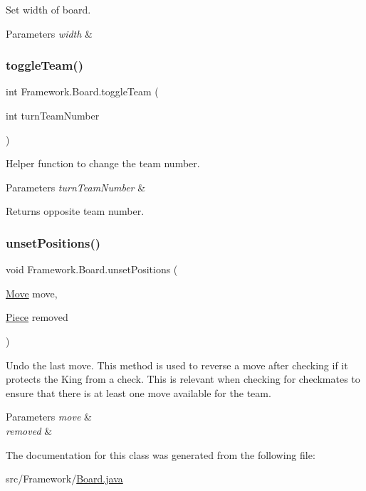 Set width of board. 
\begin{DoxyParams}{Parameters}
{\em width} & \\
\hline
\end{DoxyParams}
\hypertarget{class_framework_1_1_board_a663c0d593176957549a4d355765bbf5a}{}\label{class_framework_1_1_board_a663c0d593176957549a4d355765bbf5a} 
\subsubsection{\texorpdfstring{toggle\+Team()}{toggleTeam()}}
{\footnotesize\ttfamily int Framework.\+Board.\+toggle\+Team (\begin{DoxyParamCaption}\item[{int}]{turn\+Team\+Number }\end{DoxyParamCaption})}

Helper function to change the team number. 
\begin{DoxyParams}{Parameters}
{\em turn\+Team\+Number} & \\
\hline
\end{DoxyParams}
\begin{DoxyReturn}{Returns}
opposite team number. 
\end{DoxyReturn}
\hypertarget{class_framework_1_1_board_a9011996b5b797378ba6bf5ee295790d8}{}\label{class_framework_1_1_board_a9011996b5b797378ba6bf5ee295790d8} 
\subsubsection{\texorpdfstring{unset\+Positions()}{unsetPositions()}}
{\footnotesize\ttfamily void Framework.\+Board.\+unset\+Positions (\begin{DoxyParamCaption}\item[{\hyperlink{class_framework_1_1_move}{Move}}]{move,  }\item[{\hyperlink{class_framework_1_1_pieces_1_1_piece}{Piece}}]{removed }\end{DoxyParamCaption})}

Undo the last move. This method is used to reverse a move after checking if it protects the King from a check. This is relevant when checking for checkmates to ensure that there is at least one move available for the team. 
\begin{DoxyParams}{Parameters}
{\em move} & \\
\hline
{\em removed} & \\
\hline
\end{DoxyParams}


The documentation for this class was generated from the following file\+:\begin{DoxyCompactItemize}
\item 
src/\+Framework/\hyperlink{_board_8java}{Board.\+java}\end{DoxyCompactItemize}
